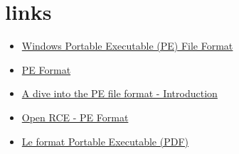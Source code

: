 \section{links}

\begin{itemize}
    \item \href{https://darkcybe.github.io/posts/Windows_PE_File_Format/}{Windows Portable Executable (PE) File Format}
    \item \href{https://learn.microsoft.com/en-us/windows/win32/debug/pe-format}{PE Format}
    \item \href{https://0xrick.github.io/win-internals/pe1/}{A dive into the PE file format - Introduction }
    \item \href{https://www.openrce.org/reference_library/files/reference/PE%20Format.pdf}{Open RCE - PE Format}
    \item \href{https://repository.root-me.org/Reverse%20Engineering/x86/Microsoft/FR%20-%20Le%20format%20Portable%20Executable%20PE.pdf}{Le format Portable Executable (PDF)}
\end{itemize}
